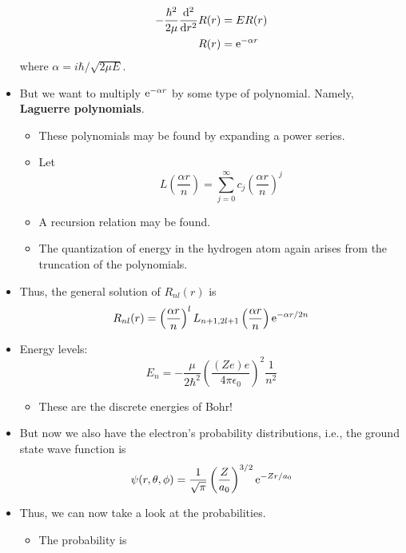 \documentclass[../notes.tex]{subfiles}
\begin{document}
\begin{itemize}
\begin{align*}
        -\frac{\hbar^2}{2\mu}\dv[2]{r}R(r) &= ER(r)\\
        R(r) &= \e[-\alpha r]
    \end{align*}
    where $\alpha=i\hbar/\sqrt{2\mu E}$.
    \item But we want to multiply $\e[-\alpha r]$ by some type of polynomial. Namely, \textbf{Laguerre polynomials}.
    \begin{itemize}
        \item These polynomials may be found by expanding a power series.
        \item Let
        \begin{equation*}
            L\left( \frac{\alpha r}{n} \right) = \sum_{j=0}^\infty c_j\left( \frac{\alpha r}{n} \right)^j
        \end{equation*}
        \item A recursion relation may be found.
        \item The quantization of energy in the hydrogen atom again arises from the truncation of the polynomials.
    \end{itemize}
    \item Thus, the general solution of $R_{nl}(r)$ is
    \begin{equation*}
        R_{nl}(r) = \left( \frac{\alpha r}{n} \right)^lL_{n+1,2l+1}\left( \frac{\alpha r}{n} \right)\e[-\alpha r/2n]
    \end{equation*}
    \item Energy levels:
    \begin{equation*}
        E_n = -\frac{\mu}{2\hbar^2}\left( \frac{(Ze)e}{4\pi\epsilon_0} \right)^2\frac{1}{n^2}
    \end{equation*}
    \begin{itemize}
        \item These are the discrete energies of Bohr!
    \end{itemize}
    \item But now we also have the electron's probability distributions, i.e., the ground state wave function is
    \begin{equation*}
        \psi(r,\theta,\phi) = \frac{1}{\sqrt{\pi}}\left( \frac{Z}{a_0} \right)^{3/2}\e[-Zr/a_0]
    \end{equation*}
    \item Thus, we can now take a look at the probabilities.
    \begin{itemize}
        \item The probability is
        \begin{equation*}

\end{equation*}
\end{itemize}
\end{itemize}
\end{document}
